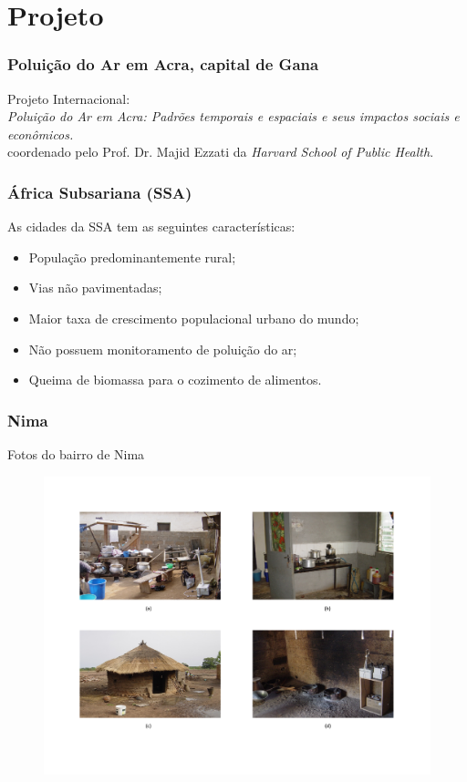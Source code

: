 \section{Projeto}

\begin{frame}
  \frametitle{Poluição do Ar em Acra, capital de Gana}
  Projeto Internacional: \\
  \textit{Poluição do Ar em Acra: Padrões temporais e espaciais e seus impactos sociais e econômicos.} \\ 
  coordenado pelo Prof. Dr. Majid Ezzati da \textit{Harvard School of Public Health}.
\end{frame}

\begin{frame}
 \frametitle{ África Subsariana (SSA)}
  As cidades da SSA tem as seguintes características: 
  \begin{itemize}
    \item População predominantemente rural;
    \item Vias não pavimentadas;
    \item Maior taxa de crescimento populacional urbano do mundo;
    \item Não possuem monitoramento de poluição do ar;
    \item Queima de biomassa para o cozimento de alimentos.
  \end{itemize}
\end{frame}

\begin{frame}
  \frametitle{Nima}
  Fotos do bairro de Nima
  \begin{figure}[H]
    \centering
    \includegraphics[scale=0.3]{../../../inputs/images/zheng/nima.pdf}
  \end{figure}
\end{frame}

